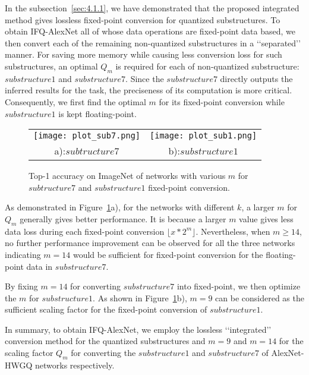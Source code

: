 \documentclass[10pt,twocolumn,letterpaper]{article}
\begin{document}
In the subsection~\ref{sec:4.1.1}, we have demonstrated that the proposed integrated method gives lossless fixed-point conversion for quantized substructures. To obtain IFQ-AlexNet all of whose data operations are fixed-point data based, we then convert each of the remaining non-quantized substructures in a \lq\lq separated\rq\rq\, manner. For saving more memory while causing less conversion loss for such substructures, an optimal $Q_m$ is required for each of non-quantized substructure: $substructure1$ and $substructure7$. Since the $substructure7$ directly outputs the inferred results for the task, the preciseness of its computation is more critical. Consequently, we first find the optimal $m$ for its fixed-point conversion while $substructure1$ is kept floating-point.

\begin{figure}[!ht]
\begin{center}
\begin{tabular} {@{}cc@{}}
\texttt{[image: plot\_sub7.png]} &
\texttt{[image: plot\_sub1.png]} \\
 a):$subtructure7$ & b):$substructure1$
\end{tabular}
\caption{Top-1 accuracy on ImageNet of networks with various $m$ for $subtructure7$ and $substructure1$ fixed-point conversion.}
\label{fig:sub7}
\end{center}
\end{figure}

As demonstrated in Figure~\ref{fig:sub7}a), for the networks with different $k$, a larger $m$ for $Q_m$ generally gives better performance. It is because a larger $m$ value gives less data loss during each fixed-point conversion $\lfloor x*2^m \rfloor$. Nevertheless, when $m\geq14$, no further performance improvement can be observed for all the three networks indicating $m=14$ would be sufficient for fixed-point conversion for the floating-point data in $substructure7$.

By fixing $m=14$ for converting $substructure7$ into fixed-point, we then optimize the $m$ for $substructure1$. As shown in Figure~\ref{fig:sub7}b), $m=9$ can be considered as the sufficient scaling factor for the fixed-point conversion of $substructure1$.



 In summary, to obtain IFQ-AlexNet, we employ the lossless \lq\lq integrated\rq\rq\, conversion method for the quantized substructures and $m=9$ and $m=14$ for the scaling factor $Q_m$ for converting the  $substructure1$ and $substructure7$ of AlexNet-HWGQ networks respectively.
\end{document}
